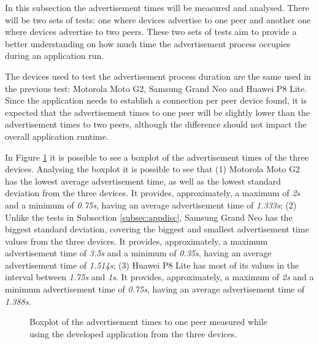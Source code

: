 In this subsection the advertisement times will be measured and analysed. There will be two sets of tests: one where devices advertise to one peer and another one where devices advertise to two peers. These two sets of tests aim to provide a better understanding on how much time the advertisement process occupies during an application run.

The devices used to test the advertisement process duration are the same used in the previous test: Motorola Moto G2, Samsung Grand Neo and Huawei P8 Lite. Since the application needs to establish a connection per peer device found, it is expected that the advertisement times to one peer will be slightly lower than the advertisement times to two peers, although the difference should not impact the overall application runtime.

In Figure \ref{fig:adv1} it is possible to see a boxplot of the advertisement times of the three devices. Analysing the boxplot it is possible to see that (1) Motorola Moto G2 has the lowest average advertisement time, as well as the lowest standard deviation from the three devices. It provides, approximately, a maximum of \textit{2s} and a minimum of \textit{0.75s}, having an average advertisement time of \textit{1.333s}; (2) Unlike the tests in Subsection \ref{subsec:appdisc}, Samsung Grand Neo has the biggest standard deviation, covering the biggest and smallest advertisement time values from the three devices. It provides, approximately, a maximum advertisement time of \textit{3.5s} and a minimum of \textit{0.35s}, having an average advertisement time of \textit{1.514s}; (3) Huawei P8 Lite has most of its values in the interval between \textit{1.75s} and \textit{1s}. It provides, approximately, a maximum of \textit{2s} and a minimum advertisement time of \textit{0.75s}, having an average advertisement time of \textit{1.388s}.

\begin{figure}[ht]
	\noindent{}
	\caption{\label{fig:adv1} Boxplot of the advertisement times to one peer measured while using the developed application from the three devices.}
\end{figure}

